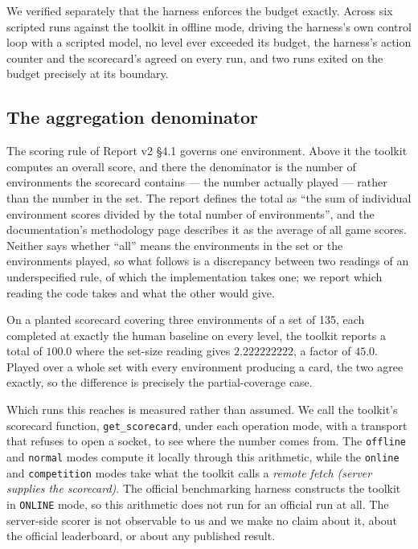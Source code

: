 \documentclass[11pt]{article}
\newcommand{\code}[1]{\texttt{#1}}
\begin{document}
We verified separately that the harness enforces the budget exactly. Across six
scripted runs against the toolkit in offline mode, driving the harness's own
control loop with a scripted model, no level ever exceeded its budget, the
harness's action counter and the scorecard's agreed on every run, and two runs
exited on the budget precisely at its boundary.

\subsection{The aggregation denominator}
\label{sec:denominator}

The scoring rule of Report v2 \S4.1 governs one environment. Above it the toolkit computes
an overall score, and there the denominator is the number of environments the
scorecard contains --- the number actually played --- rather than the number in
the set. The report defines the total as ``the sum of individual environment
scores divided by the total number of environments'', and the documentation's
methodology page describes it as the average of all game scores. Neither says
whether ``all'' means the environments in the set or the environments played, so
what follows is a discrepancy between two readings of an underspecified rule, of
which the implementation takes one; we report which reading the code takes and
what the other would give.

On a planted scorecard covering three environments of a set of 135, each
completed at exactly the human baseline on every level, the toolkit reports a
total of $100.0$ where the set-size reading gives $2.222222222$, a factor of
$45.0$. Played over a whole set with every environment producing a card, the two agree exactly, so the difference is
precisely the partial-coverage case.

Which runs this reaches is measured rather than assumed. We call the toolkit's
scorecard function, \code{get\_scorecard}, under each operation mode, with a transport that refuses to
open a socket, to see where the number comes from. The \code{offline} and
\code{normal} modes compute it locally through this arithmetic, while the
\code{online} and \code{competition} modes take what the toolkit calls a
\emph{remote fetch (server supplies the scorecard)}. The official benchmarking harness constructs the
toolkit in \code{ONLINE} mode, so this arithmetic does not run for an official
run at all. The server-side scorer is not observable to us and we make no claim
about it, about the official leaderboard, or about any published result.
\end{document}
